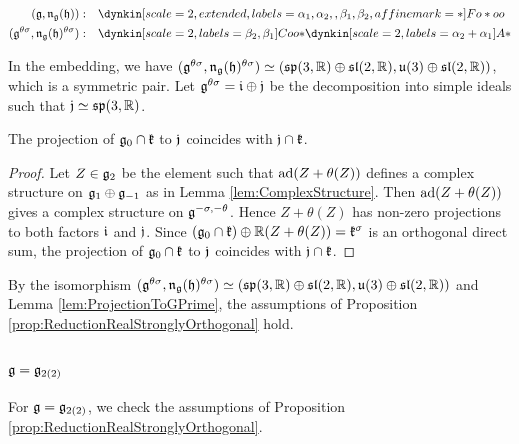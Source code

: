 \begin{align*}
	(\lie{g}, \lieNorm_{\lie{g}}(\lie{h})): \quad & \dynkin[scale=2, extended, labels={\alpha_1, \alpha_2, , \beta_1, \beta_2}, affine mark=*]{F}{o*oo} \\
	(\lie{g}^{\theta\sigma}, \lieNorm_{\lie{g}}(\lie{h})^{\theta\sigma}): \quad & \dynkin[scale=2, labels={\beta_2, \beta_1}]{C}{oo*}
	\dynkin[scale=2, labels={\alpha_2 + \alpha_1}]{A}{*}
\end{align*}

In the embedding, we have $(\mathfrak{g}^{\theta\sigma}, \mathfrak{n}_{\mathfrak{g}}(\mathfrak{h})^{\theta\sigma}) \simeq (\mathfrak{sp}(3, \mathbb{R}) \oplus \mathfrak{sl}(2,\mathbb{R}), \mathfrak{u}(3) \oplus \mathfrak{sl}(2, \mathbb{R}))$, which is a symmetric pair.
Let $\mathfrak{g}^{\theta\sigma} = \mathfrak{i} \oplus \mathfrak{j}$ be the decomposition into simple ideals such that $\mathfrak{j} \simeq \mathfrak{sp}(3, \mathbb{R})$.

\begin{lemma} \label{lem:ProjectionToGPrime}
	The projection of $\mathfrak{g}_0\cap \mathfrak{k}$ to $\mathfrak{j}$ coincides with $\mathfrak{j}\cap \mathfrak{k}$.
\end{lemma}

\begin{proof}
	Let $Z\in \mathfrak{g}_2$ be the element such that $\mathrm{ad}(Z+\theta(Z))$ defines a complex structure on $\mathfrak{g}_1 \oplus \mathfrak{g}_{-1}$ as in Lemma \ref{lem:ComplexStructure}.
	Then $\mathrm{ad}(Z+\theta(Z))$ gives a complex structure on $\mathfrak{g}^{-\sigma, -\theta}$.
	Hence $Z+\theta(Z)$ has non-zero projections to both factors $\mathfrak{i}$ and $\mathfrak{j}$.
	Since $(\mathfrak{g}_0\cap \mathfrak{k}) \oplus \mathbb{R} (Z+\theta(Z)) = \mathfrak{k}^{\sigma}$ is an orthogonal direct sum, the projection of $\mathfrak{g}_0\cap \mathfrak{k}$ to $\mathfrak{j}$ coincides with $\mathfrak{j}\cap \mathfrak{k}$.
\end{proof}

By the isomorphism $(\mathfrak{g}^{\theta\sigma}, \mathfrak{n}_{\mathfrak{g}}(\mathfrak{h})^{\theta\sigma}) \simeq (\mathfrak{sp}(3, \mathbb{R}) \oplus \mathfrak{sl}(2,\mathbb{R}), \mathfrak{u}(3) \oplus \mathfrak{sl}(2, \mathbb{R}))$ and Lemma \ref{lem:ProjectionToGPrime}, the assumptions of Proposition \ref{prop:ReductionRealStronglyOrthogonal} hold.


\subsubsection{\texorpdfstring{$\mathfrak{g} = \mathfrak{g}_{2(2)}$}{g=G2(2)}}


For $\mathfrak{g} = \mathfrak{g}_{2(2)}$, we check the assumptions of Proposition \ref{prop:ReductionRealStronglyOrthogonal}.

